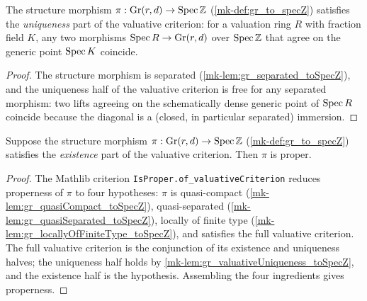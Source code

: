 \begin{lemma}\label{mk-lem:gr_valuativeUniqueness_toSpecZ}
  \leanok

  The structure morphism \(\pi : \mathrm{Gr}(r,d) \to \operatorname{Spec} \mathbb{Z}\)
  (\ref{mk-def:gr_to_specZ}) satisfies the \emph{uniqueness} part of the valuative
  criterion: for a valuation ring \(R\) with fraction field \(K\), any two
  morphisms \(\operatorname{Spec} R \to \mathrm{Gr}(r,d)\) over \(\operatorname{Spec} \mathbb{Z}\) that agree
  on the generic point \(\operatorname{Spec} K\) coincide.
\end{lemma}
\begin{proof}
  \leanok
  The structure morphism is separated (\ref{mk-lem:gr_separated_toSpecZ}), and the
  uniqueness half of the valuative criterion is free for any separated morphism:
  two lifts agreeing on the schematically dense generic point of \(\operatorname{Spec} R\)
  coincide because the diagonal is a (closed, in particular separated) immersion.
\end{proof}

\begin{lemma}\label{mk-lem:gr_isProper_of_valuativeExistence}
  \leanok

  Suppose the structure morphism \(\pi : \mathrm{Gr}(r,d) \to \operatorname{Spec} \mathbb{Z}\)
  (\ref{mk-def:gr_to_specZ}) satisfies the \emph{existence} part of the valuative
  criterion. Then \(\pi\) is proper.
\end{lemma}
\begin{proof}
  \leanok
    The Mathlib criterion \texttt{IsProper.of\_valuativeCriterion} reduces properness
  of \(\pi\) to four hypotheses: \(\pi\) is quasi-compact
  (\ref{mk-lem:gr_quasiCompact_toSpecZ}), quasi-separated
  (\ref{mk-lem:gr_quasiSeparated_toSpecZ}), locally of finite type
  (\ref{mk-lem:gr_locallyOfFiniteType_toSpecZ}), and satisfies the full valuative
  criterion. The full valuative criterion is the conjunction of its existence and
  uniqueness halves; the uniqueness half holds by
  \ref{mk-lem:gr_valuativeUniqueness_toSpecZ}, and the existence half is the
  hypothesis. Assembling the four ingredients gives properness.
\end{proof}

